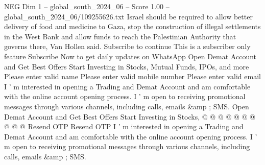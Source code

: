 \begin{textsample}{NEG Dim 1 – global\_south\_2024\_06 – Score 1.00 – global\_south\_2024\_06/109255626.txt}
Israel should be required to allow better delivery of food and medicine to Gaza, stop the construction of illegal settlements in the West Bank and allow funds to reach the Palestinian Authority that governs there, Van Hollen said.
Subscribe to continue This is a subscriber only feature Subscribe Now to get daily updates on WhatsApp Open Demat Account and Get Best Offers Start Investing in Stocks, Mutual Funds, IPOs, and more Please enter valid name Please enter valid mobile number Please enter valid email I ' m interested in opening a Trading and Demat Account and am comfortable with the online account opening process.
I ' m open to receiving promotional messages through various channels, including calls, emails \&amp ; SMS.
Open Demat Account and Get Best Offers Start Investing in Stocks, @ @ @ @ @ @ @ @ @ @ Resend OTP Resend OTP I ' m interested in opening a Trading and Demat Account and am comfortable with the online account opening process.
I ' m open to receiving promotional messages through various channels, including calls, emails \&amp ; SMS.

\end{textsample}
